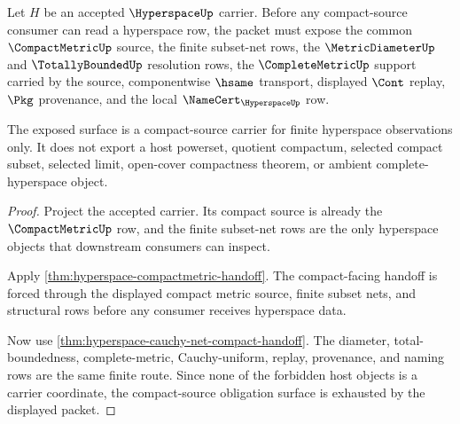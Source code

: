 \begin{theorem}
\label{thm:hyperspace-compact-source-carrier-obligations}
Let $H$ be an accepted $\HyperspaceUp$ carrier. Before any compact-source consumer can read a hyperspace row, the packet must expose the common $\CompactMetricUp$ source, the finite subset-net rows, the $\MetricDiameterUp$ and $\TotallyBoundedUp$ resolution rows, the $\CompleteMetricUp$ support carried by the source, componentwise $\hsame$ transport, displayed $\Cont$ replay, $\Pkg$ provenance, and the local $\NameCert_{\HyperspaceUp}$ row.

The exposed surface is a compact-source carrier for finite hyperspace observations only. It does not export a host powerset, quotient compactum, selected compact subset, selected limit, open-cover compactness theorem, or ambient complete-hyperspace object.
\end{theorem}
\begin{proof}
Project the accepted carrier. Its compact source is already the $\CompactMetricUp$ row, and the finite subset-net rows are the only hyperspace objects that downstream consumers can inspect.

Apply \autoref{thm:hyperspace-compactmetric-handoff}. The compact-facing handoff is forced through the displayed compact metric source, finite subset nets, and structural rows before any consumer receives hyperspace data.

Now use \autoref{thm:hyperspace-cauchy-net-compact-handoff}. The diameter, total-boundedness, complete-metric, Cauchy-uniform, replay, provenance, and naming rows are the same finite route. Since none of the forbidden host objects is a carrier coordinate, the compact-source obligation surface is exhausted by the displayed packet.
\end{proof}


